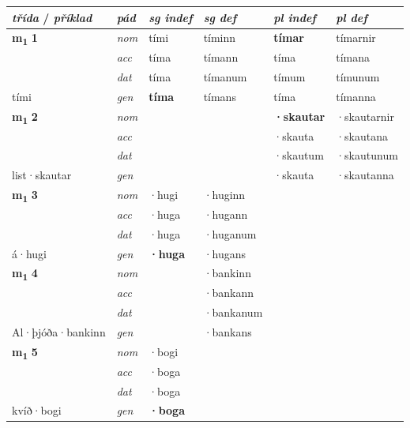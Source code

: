 
\begin{longtable}[l]{X>{\footnotesize\itshape}XXXXX}
{\textbf{\textit{třída}} / \textit{příklad}} & {\textit{pád}} & {\textit{sg indef}} & {\textit{sg def}} & {\textit{pl indef}} & {\textit{pl def}}\\ \cmidrule{1-6}
\endhead
\multirow{3}{*}{{{\textbf{m{\textsubscript{1}}} \Large{\textbf{1}}}}} & nom & tími & tíminn & \textbf{tímar} & tímarnir \\*
 & acc & tíma & tímann & tíma & tímana \\*
 & dat & tíma & tímanum & tímum & tímunum \\*
 {\footnotesize{tími}} & gen & \textbf{tíma} & tímans & tíma & tímanna \\
\cmidrule{1-6}

\multirow{3}{*}{{{\textbf{m{\textsubscript{1}}} \Large{\textbf{2}}}}} & nom &  &  & \textbf{·skautar} & ·skautarnir \\*
 & acc &  &  & ·skauta & ·skautana \\*
 & dat &  &  & ·skautum & ·skautunum \\*
 {\footnotesize{list\allowbreak ·skautar}} & gen & \textbf{} &  & ·skauta & ·skautanna \\
\cmidrule{1-6}

\multirow{3}{*}{{{\textbf{m{\textsubscript{1}}} \Large{\textbf{3}}}}} & nom & ·hugi & ·huginn & \textbf{} &  \\*
 & acc & ·huga & ·hugann &  &  \\*
 & dat & ·huga & ·huganum &  &  \\*
 {\footnotesize{á\allowbreak ·hugi}} & gen & \textbf{·huga} & ·hugans &  &  \\
\cmidrule{1-6}

\multirow{3}{*}{{{\textbf{m{\textsubscript{1}}} \Large{\textbf{4}}}}} & nom &  & ·bankinn & \textbf{} &  \\*
 & acc &  & ·bankann &  &  \\*
 & dat &  & ·bankanum &  &  \\*
 {\footnotesize{Al\allowbreak ·þjóða\allowbreak ·bankinn}} & gen & \textbf{} & ·bankans &  &  \\
\cmidrule{1-6}

\multirow{3}{*}{{{\textbf{m{\textsubscript{1}}} \Large{\textbf{5}}}}} & nom & ·bogi &  & \textbf{} &  \\*
 & acc & ·boga &  &  &  \\*
 & dat & ·boga &  &  &  \\*
 {\footnotesize{kvíð\allowbreak ·bogi}} & gen & \textbf{·boga} &  &  &  \\
\cmidrule{1-6}


\end{longtable}
